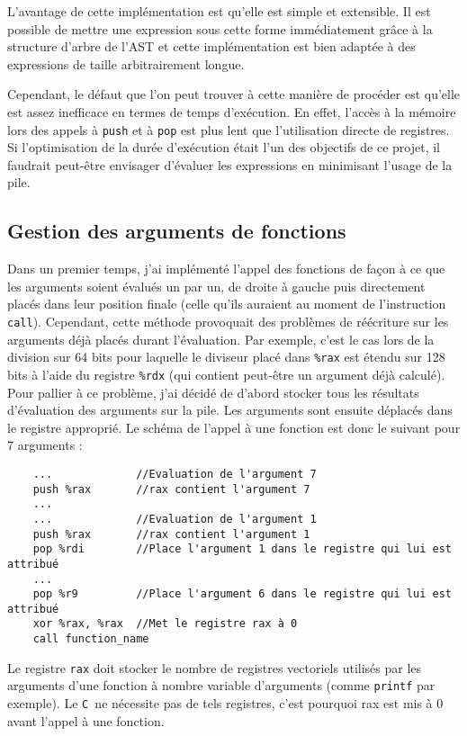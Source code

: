 \documentclass[11pt]{article}
\newcommand{\Cmm}{\texttt{C\textminus\textminus\ }}
\newcommand{\ttt}[1]{\texttt{#1}}
\begin{document}
L'avantage de cette implémentation est qu'elle est simple et extensible.
Il est possible de mettre une expression sous cette forme immédiatement grâce à la structure d'arbre de l'AST et cette implémentation est bien adaptée à des expressions de taille arbitrairement longue.

Cependant, le défaut que l'on peut trouver à cette manière de procéder est qu'elle est assez inefficace en termes de temps d'exécution.
En effet, l'accès à la mémoire lors des appels à \ttt{push} et à \ttt{pop} est plus lent que l'utilisation directe de registres.
Si l'optimisation de la durée d'exécution était l'un des objectifs de ce projet, il faudrait peut-être envisager d'évaluer les expressions en minimisant l'usage de la pile.

\subsection{Gestion des arguments de fonctions}
Dans un premier temps, j'ai implémenté l'appel des fonctions de façon à ce que les arguments soient évalués un par un, de droite à gauche puis directement placés dans leur position finale (celle qu'ils auraient au moment de l'instruction \ttt{call}).
Cependant, cette méthode provoquait des problèmes de réécriture sur les arguments déjà placés durant l'évaluation.
Par exemple, c'est le cas lors de la division sur 64 bits pour laquelle le diviseur placé dans \ttt{\%rax} est étendu sur 128 bits à l'aide du registre \ttt{\%rdx} (qui contient peut-être un argument déjà calculé).
Pour pallier à ce problème, j'ai décidé de d'abord stocker tous les résultats d'évaluation des arguments sur la pile.
Les arguments sont ensuite déplacés dans le registre approprié.
Le schéma de l'appel à une fonction est donc le suivant pour 7 arguments :
\newpage
\begin{lstlisting}
    ...             //Evaluation de l'argument 7
    push %rax       //rax contient l'argument 7
    ...             
    ...             //Evaluation de l'argument 1
    push %rax       //rax contient l'argument 1
    pop %rdi        //Place l'argument 1 dans le registre qui lui est attribué
    ...             
    pop %r9         //Place l'argument 6 dans le registre qui lui est attribué
    xor %rax, %rax  //Met le registre rax à 0
    call function_name
\end{lstlisting}
Le registre \ttt{rax} doit stocker le nombre de registres vectoriels utilisés par les arguments d'une fonction à nombre variable d'arguments (comme \ttt{printf} par exemple).
Le \Cmm ne nécessite pas de tels registres, c'est pourquoi rax est mis à 0 avant l'appel à une fonction.
\end{document}
